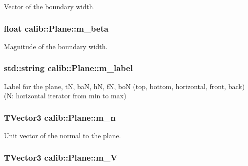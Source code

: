 Vector of the boundary width. 

\hypertarget{classcalib_1_1Plane_a7179b236f986dd928b0244506aa59f9e}{
\subsubsection[{m\-\_\-beta}]{\setlength{\rightskip}{0pt plus 5cm}float calib\-::\-Plane\-::m\-\_\-beta\hspace{0.3cm}{\ttfamily [private]}}}\label{classcalib_1_1Plane_a7179b236f986dd928b0244506aa59f9e}


Magnitude of the boundary width. 

\hypertarget{classcalib_1_1Plane_a1e067cd4c2ba95ed9bba40417f12d8ed}{
\subsubsection[{m\-\_\-label}]{\setlength{\rightskip}{0pt plus 5cm}std\-::string calib\-::\-Plane\-::m\-\_\-label\hspace{0.3cm}{\ttfamily [private]}}}\label{classcalib_1_1Plane_a1e067cd4c2ba95ed9bba40417f12d8ed}


Label for the plane, t\-N, ba\-N, h\-N, f\-N, bo\-N (top, bottom, horizontal, front, back) (N\-: horizontal iterator from min to max) 

\hypertarget{classcalib_1_1Plane_ab34583a66659f2621203b77305f2da15}{
\subsubsection[{m\-\_\-n}]{\setlength{\rightskip}{0pt plus 5cm}T\-Vector3 calib\-::\-Plane\-::m\-\_\-n\hspace{0.3cm}{\ttfamily [private]}}}\label{classcalib_1_1Plane_ab34583a66659f2621203b77305f2da15}


Unit vector of the normal to the plane. 

\hypertarget{classcalib_1_1Plane_ab1095167213eea938897a1ba91a6ddfb}{
\subsubsection[{m\-\_\-\-V}]{\setlength{\rightskip}{0pt plus 5cm}T\-Vector3 calib\-::\-Plane\-::m\-\_\-\-V\hspace{0.3cm}{\ttfamily [private]}}}\label{classcalib_1_1Plane_ab1095167213eea938897a1ba91a6ddfb}


